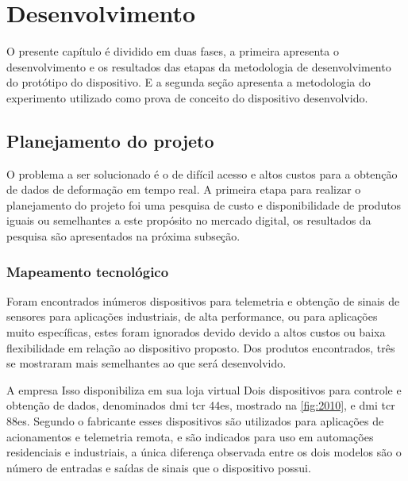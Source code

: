 
\chapter{Desenvolvimento}

O presente capítulo é dividido em duas fases, a primeira apresenta o desenvolvimento e os resultados das etapas da metodologia de desenvolvimento do protótipo do dispositivo.
E a segunda seção apresenta a metodologia do experimento utilizado como prova de conceito do dispositivo desenvolvido.

\section{Planejamento do projeto}

O problema a ser solucionado é o de difícil acesso e altos custos para a obtenção de dados de deformação em tempo real.
A primeira etapa para realizar o planejamento do projeto foi uma pesquisa de custo e disponibilidade de produtos iguais ou semelhantes a este propósito no mercado digital,
os resultados da pesquisa são apresentados na próxima subseção.

\subsection{Mapeamento tecnológico}

Foram encontrados inúmeros dispositivos para telemetria e obtenção de sinais de sensores para aplicações industriais, de alta performance, ou para aplicações muito específicas,
estes foram ignorados devido devido a altos custos ou baixa flexibilidade em relação ao dispositivo proposto. Dos produtos encontrados, três se mostraram mais semelhantes ao que será desenvolvido.

A empresa Isso disponibiliza em sua loja virtual Dois dispositivos para controle e obtenção de dados, denominados dmi tcr 44es, mostrado na \autoref{fig:2010}, e dmi tcr 88es.
Segundo o fabricante esses dispositivos são utilizados para aplicações de acionamentos e telemetria remota, e são indicados para uso em automações residenciais e industriais,
a única diferença observada entre os dois modelos são o número de entradas e saídas de sinais que o dispositivo possui. \autocite{Isso44es}

